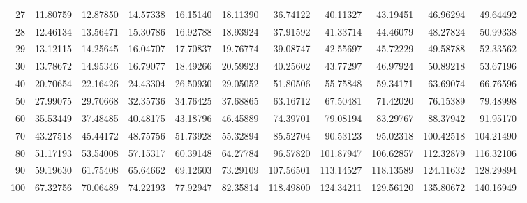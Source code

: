 {{\begin{sideways}
\begin{minipage}[t]{\textwidth}
\begin{small}
{\begin{tabular}{|r|rrrrr||rrrrr|}
 27& 11.80759& 12.87850& 14.57338& 16.15140& 18.11390& 36.74122& 40.11327& 43.19451& 46.96294& 49.64492\\
 28& 12.46134& 13.56471& 15.30786& 16.92788& 18.93924& 37.91592& 41.33714& 44.46079& 48.27824& 50.99338\\
 29& 13.12115& 14.25645& 16.04707& 17.70837& 19.76774& 39.08747& 42.55697& 45.72229& 49.58788& 52.33562\\
 30& 13.78672& 14.95346& 16.79077& 18.49266& 20.59923& 40.25602& 43.77297& 46.97924& 50.89218& 53.67196\\
 40& 20.70654& 22.16426& 24.43304& 26.50930& 29.05052& 51.80506& 55.75848& 59.34171& 63.69074& 66.76596\\
 50& 27.99075& 29.70668& 32.35736& 34.76425& 37.68865& 63.16712& 67.50481& 71.42020& 76.15389& 79.48998\\
 60& 35.53449& 37.48485& 40.48175& 43.18796& 46.45889& 74.39701& 79.08194& 83.29767& 88.37942& 91.95170\\
 70& 43.27518& 45.44172& 48.75756& 51.73928& 55.32894& 85.52704& 90.53123& 95.02318&100.42518&104.21490\\
 80& 51.17193& 53.54008& 57.15317& 60.39148& 64.27784& 96.57820&101.87947&106.62857&112.32879&116.32106\\
 90& 59.19630& 61.75408& 65.64662& 69.12603& 73.29109&107.56501&113.14527&118.13589&124.11632&128.29894\\
100& 67.32756& 70.06489& 74.22193& 77.92947& 82.35814&118.49800&124.34211&129.56120&135.80672&140.16949\\
\hline
\end{tabular}}
\end{small}
\end{minipage}
\end{sideways}}}

\addtolength{\textheight}{-5mm}
\addtolength{\textwidth}{-15mm}